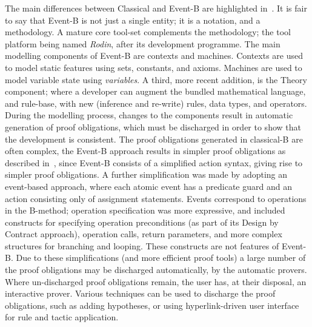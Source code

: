 The main differences between Classical and Event-B are highlighted in~\cite{Hallerstede07}. It is fair to say that Event-B is not just a single entity;  it is a notation, and a methodology. A mature core tool-set complements the methodology; the tool platform being named \emph{Rodin}, after its development programme. The main modelling components of Event-B are contexts and machines. Contexts are used to model static features using sets, constants, and axioms. Machines are used to model variable state using \emph{variables}. A third, more recent addition, is the Theory component; where a developer can augment the bundled mathematical language, and rule-base, with new (inference and re-write) rules, data types, and operators. During the modelling process, changes to the components result in automatic generation of proof obligations, which must be discharged in order to show that the development is consistent. The proof obligations generated in classical-B are often complex, the Event-B approach results in simpler proof obligations as described in~\cite{Hallerstede07}, since Event-B consists of a simplified action syntax, giving rise to simpler proof obligations. A further simplification was made by adopting an event-based approach, where each atomic event has a predicate guard and an action consisting only of assignment statements. Events correspond to operations in the B-method; operation specification was more expressive, and included constructs for specifying operation preconditions (as part of its Design by Contract approach), operation calls, return parameters, and more complex structures for branching and looping. These constructs are not features of Event-B. Due to these simplifications (and more efficient proof tools) a large number of the proof obligations may be discharged automatically, by the automatic provers. Where un-discharged proof obligations remain, the user has, at their disposal, an interactive prover. Various techniques can be used to discharge the proof obligations, such as adding hypotheses, or using hyperlink-driven user interface for rule and tactic application. 

